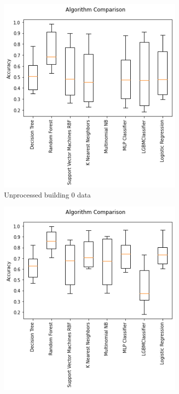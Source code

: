 \documentclass[a4paper,singleside,12pt]{report} %
\begin{document}
			\begin{figure}[!htb]
			  \centering
			  \begin{subfigure}[b]{0.48\linewidth}
			    \includegraphics[width=\linewidth]{./figures/results_model_comparison_unprocessed_building0_data.png}
			     \caption{Unprocessed building 0 data}
			  \end{subfigure}
			  \begin{subfigure}[b]{0.48\linewidth}
			    \includegraphics[width=\linewidth]{./figures/results_model_comparison_preprocessed_building0_data.png}

\end{subfigure}
\end{figure}
\end{document}
